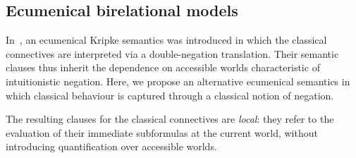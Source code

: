 \subsection{Ecumenical birelational models}\label{sec:bi}
In~\cite{luiz17}, an ecumenical Kripke semantics was introduced in which the classical connectives are interpreted via a double-negation translation. Their semantic clauses thus inherit the dependence on accessible worlds characteristic of intuitionistic negation. Here, we propose an alternative ecumenical semantics in which classical behaviour is captured through a classical notion of negation. 

The resulting clauses for the classical connectives are \emph{local}: they refer to the evaluation of their immediate subformulas at the current world, without introducing quantification over accessible worlds. %

